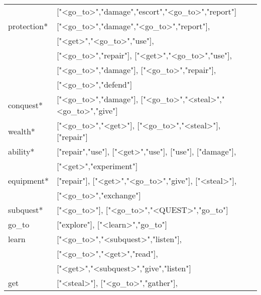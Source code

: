 \begin{table}[]
{\begin{tabular}{ll}
 &
 {[}"\textless{}go\_to\textgreater{}","damage","escort","\textless{}go\_to\textgreater{}","report"{]} \\
protection* &
  {[}"\textless{}go\_to\textgreater{}","damage","\textless{}go\_to\textgreater{}","report"{]},   \\
 &
 {[}"\textless{}get\textgreater{}","\textless{}go\_to\textgreater{}","use"{]}, \\
 &
  {[}"\textless{}go\_to\textgreater{}","repair"{]},   {[}"\textless{}get\textgreater{}","\textless{}go\_to\textgreater{}","use"{]},   \\
 &
 {[}"\textless{}go\_to\textgreater{}","damage"{]}, {[}"\textless{}go\_to\textgreater{}","repair"{]}, \\
 &
     {[}"\textless{}go\_to\textgreater{}","defend"{]} \\
conquest* &
  {[}"\textless{}go\_to\textgreater{}","damage"{]},   {[}"\textless{}go\_to\textgreater{}","\textless{}steal\textgreater{}","\textless{}go\_to\textgreater{}","give"{]} \\
wealth* &
  {[}"\textless{}go\_to\textgreater{}","\textless{}get\textgreater{}"{]},   {[}"\textless{}go\_to\textgreater{}","\textless{}steal\textgreater{}"{]}, {[}"repair"{]} \\
ability* &
  {[}"repair","use"{]},   {[}"\textless{}get\textgreater{}","use"{]}, {[}"use"{]},   {[}"damage"{]}, \\
 &
  {[}"\textless{}get\textgreater{}","experiment"{]} \\
equipment* &
  {[}"repair"{]},   {[}"\textless{}get\textgreater{}","\textless{}go\_to\textgreater{}","give"{]},   {[}"\textless{}steal\textgreater{}"{]},\\
 &
  {[}"\textless{}go\_to\textgreater{}","exchange"{]} \\
subquest* &
  {[}"\textless{}go\_to\textgreater{}"{]},   {[}"\textless{}go\_to\textgreater{}","\textless{}QUEST\textgreater{}","go\_to"{]} \\
go\_to &
  {[}"explore"{]},   {[}"\textless{}learn\textgreater{}","go\_to"{]} \\
learn &
  {[}"\textless{}go\_to\textgreater{}","\textless{}subquest\textgreater{}","listen"{]},   \\
 &
 {[}"\textless{}go\_to\textgreater{}","\textless{}get\textgreater{}","read"{]}, \\
 &
  {[}"\textless{}get\textgreater{}","\textless{}subquest\textgreater{}","give","listen"{]} \\
get &
  {[}"\textless{}steal\textgreater{}"{]},   {[}"\textless{}go\_to\textgreater{}","gather"{]}, \\

\end{tabular}}
\end{table}
